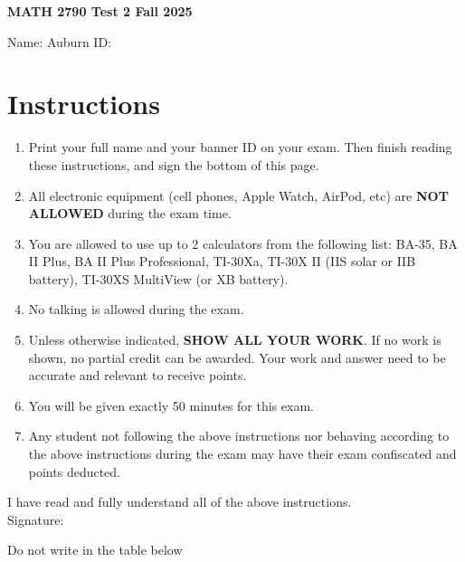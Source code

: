 \documentclass[12pt]{article}
\begin{document}
\begin{center}
    \Large \textbf{MATH 2790 Test 2 Fall 2025} \\[1em]
\end{center}

\vspace{.25cm}

\noindent Name: \underline{\hspace{8cm}} \hspace{.25cm} Auburn ID: \underline{\hspace{4cm}}



\section*{Instructions}
\begin{enumerate}[label=\arabic*.]
\item Print your full name and your banner ID on your exam. Then finish reading these instructions, and sign the bottom of this page.
\item All electronic equipment (cell phones, Apple Watch, AirPod, etc) are \textbf{NOT ALLOWED} during the exam time.
\item You are allowed to use up to 2 calculators from the following list: BA-35, BA II Plus, BA II Plus Professional, TI-30Xa, TI-30X II (IIS solar or IIB battery), TI-30XS MultiView (or XB battery).
\item No talking is allowed during the exam.
\item Unless otherwise indicated, \textbf{SHOW ALL YOUR WORK}. If no work is shown, no partial credit can be awarded. Your work and answer need to be accurate and relevant to receive points.
\item You will be given exactly 50 minutes for this exam.
\item Any student not following the above instructions nor behaving according to the above instructions during the exam may have their exam confiscated and points deducted.
\end{enumerate}

I have read and fully understand all of the above instructions. \\[2em]
Signature: \hrulefill


\vspace{.75cm}
Do not write in the table below
\end{document}
